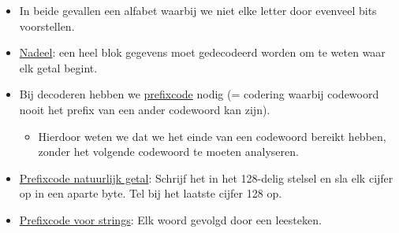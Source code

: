 \documentclass{report}
\begin{document}
\begin{itemize}
	\item[\info] In beide gevallen een alfabet waarbij we niet elke letter door evenveel bits voorstellen.
	\item[\alert] \underline{Nadeel}: een heel blok gegevens moet gedecodeerd worden om te weten waar elk getal begint.
	\item[\info] Bij decoderen hebben we \underline{prefixcode} nodig (= codering waarbij codewoord nooit het prefix van een ander codewoord kan zijn).
	\begin{itemize}
		\item[\good] Hierdoor weten we dat we het einde van een codewoord bereikt hebben, zonder het volgende codewoord te moeten analyseren.
	\end{itemize}
	\item[\info] \underline{Prefixcode natuurlijk getal}: Schrijf het in het 128-delig stelsel en sla elk cijfer op in een aparte byte. Tel bij het laatste cijfer 128 op.
	\item[\info] \underline{Prefixcode voor strings}: Elk woord gevolgd door een leesteken.
\end{itemize}
\end{document}
